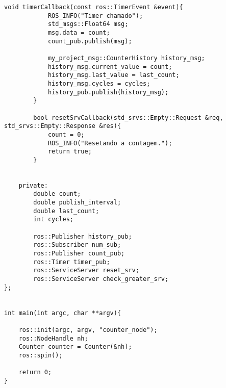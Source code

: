 \documentclass[letterpaper]{article}
\begin{document}
\begin{lstlisting}[style=cppstyle, title=src/my\_project\_cpp/src/counter.cpp]
        void timerCallback(const ros::TimerEvent &event){
            ROS_INFO("Timer chamado");
            std_msgs::Float64 msg;
            msg.data = count;
            count_pub.publish(msg);

            my_project_msg::CounterHistory history_msg;
            history_msg.current_value = count;
            history_msg.last_value = last_count;
            history_msg.cycles = cycles;
            history_pub.publish(history_msg);
        }

        bool resetSrvCallback(std_srvs::Empty::Request &req, std_srvs::Empty::Response &res){
            count = 0;
            ROS_INFO("Resetando a contagem.");
            return true;
        }

        
    private:
        double count;
        double publish_interval;
        double last_count;
        int cycles;

        ros::Publisher history_pub;
        ros::Subscriber num_sub;
        ros::Publisher count_pub;
        ros::Timer timer_pub;
        ros::ServiceServer reset_srv;
        ros::ServiceServer check_greater_srv;
};


int main(int argc, char **argv){

    ros::init(argc, argv, "counter_node");
    ros::NodeHandle nh;
    Counter counter = Counter(&nh);
    ros::spin();

    return 0;
}

\end{lstlisting}
\end{document}
